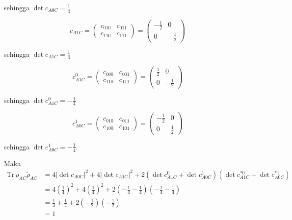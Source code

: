 sehingga $\det c_{A0C} = \frac{1}{4}$

\begin{equation}
	c_{A1C}=
	\begin{pmatrix}
		c_{010} & c_{011} \\
		c_{110} & c_{111}
	\end{pmatrix}=
	\begin{pmatrix}
		-\frac{1}{2} & 0 \\
		0 & -\frac{1}{2}
	\end{pmatrix}
\end{equation}

sehingga $\det c_{A1C} = \frac{1}{4}$

\begin{equation}
	c_{A1C}^0=
	\begin{pmatrix}
		c_{000} & c_{001} \\
		c_{110} & c_{111}
	\end{pmatrix}=
	\begin{pmatrix}
		\frac{1}{2} & 0 \\
		0 & -\frac{1}{2}
	\end{pmatrix}
\end{equation}

sehingga $\det c_{A1C}^0 = -\frac{1}{4}$

\begin{equation}
	c_{A0C}^1=
	\begin{pmatrix}
		c_{010} & c_{011} \\
		c_{100} & c_{101}
	\end{pmatrix}=
	\begin{pmatrix}
		-\frac{1}{2} & 0 \\
		0 & \frac{1}{2}
	\end{pmatrix}
\end{equation}

sehingga $\det c_{A0C}^1 = -\frac{1}{4}$.

Maka
\begin{equation}
	\begin{aligned}
		\mathrm{Tr}\,\rho_{AC}\tilde{\rho}_{AC}
		&=4|\det c_{A0C}|^2+4|\det c_{A1C}|^2+2(\det c_{A1C}^0+ \det c_{A0C}^1)(\det c^{*0}_{A1C} + \det c^{*1}_{A0C})\\
		&=4(\frac{1}{4})^2+4(\frac{1}{4})^2+2(-\frac{1}{4}-\frac{1}{4})(-\frac{1}{4}-\frac{1}{4})\\
		&=\frac{1}{4}+\frac{1}{4}+2(-\frac{1}{2})(-\frac{1}{2})\\
		&=1
	\end{aligned}
\end{equation}

